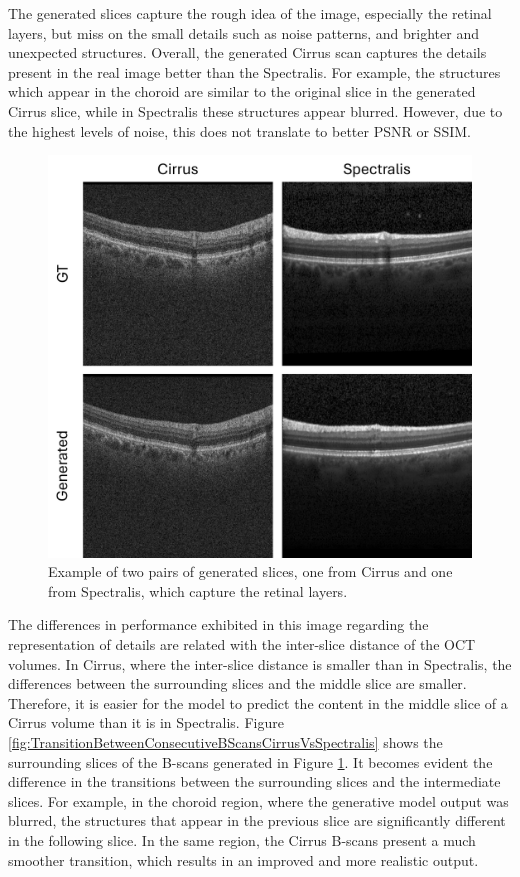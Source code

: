 \par
The generated slices capture the rough idea of the image, especially the retinal layers, but miss on the small details such as noise patterns, and brighter and unexpected structures. Overall, the generated Cirrus scan captures the details present in the real image better than the Spectralis. For example, the structures which appear in the choroid are similar to the original slice in the generated Cirrus slice, while in Spectralis these structures appear blurred. However, due to the highest levels of noise, this does not translate to better PSNR or SSIM.

\begin{figure}[!ht]
	\centering	\includegraphics[width=0.75\linewidth]{figures/GeneratedSlicesCirrusVsSpectralis.png}
	\caption{Example of two pairs of generated slices, one from Cirrus and one from Spectralis, which capture the retinal layers.}
	\label{fig:GeneratedSlicesCirrusVsSpectralis}
\end{figure}

The differences in performance exhibited in this image regarding the representation of details are related with the inter-slice distance of the OCT volumes. In Cirrus, where the inter-slice distance is smaller than in Spectralis, the differences between the surrounding slices and the middle slice are smaller. Therefore, it is easier for the model to predict the content in the middle slice of a Cirrus volume than it is in Spectralis. Figure \ref{fig:TransitionBetweenConsecutiveBScansCirrusVsSpectralis} shows the surrounding slices of the B-scans generated in Figure \ref{fig:GeneratedSlicesCirrusVsSpectralis}. It becomes evident the difference in the transitions between the surrounding slices and the intermediate slices. For example, in the choroid region, where the generative model output was blurred, the structures that appear in the previous slice are significantly different in the following slice. In the same region, the Cirrus B-scans present a much smoother transition, which results in an improved and more realistic output.

